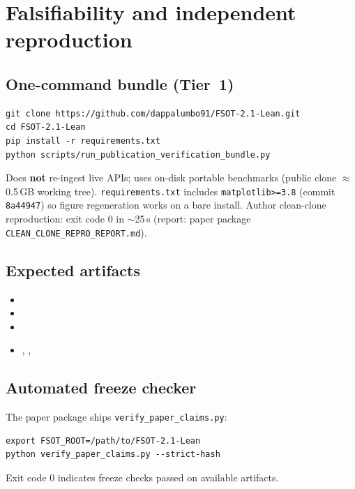 \documentclass[11pt,a4paper]{article}
\begin{document}
\section{Falsifiability and independent reproduction}
\label{sec:repro}

\subsection{One-command bundle (Tier~1)}

\begin{verbatim}
git clone https://github.com/dappalumbo91/FSOT-2.1-Lean.git
cd FSOT-2.1-Lean
pip install -r requirements.txt
python scripts/run_publication_verification_bundle.py
\end{verbatim}

Does \textbf{not} re-ingest live APIs; uses on-disk portable benchmarks
(public clone $\approx$0.5\,GB working tree).
\texttt{requirements.txt} includes \texttt{matplotlib>=3.8} (commit
\texttt{8a44947}) so figure regeneration works on a bare install.
Author clean-clone reproduction: exit code 0 in $\sim$25\,s
(report: paper package \texttt{CLEAN\_CLONE\_REPRO\_REPORT.md}).

\subsection{Expected artifacts}

\begin{itemize}[leftmargin=*,itemsep=0pt]
\item {}
\item {}
\item {}
\item {},
      , 
\end{itemize}

\subsection{Automated freeze checker}

The paper package ships \texttt{verify\_paper\_claims.py}:
\begin{verbatim}
export FSOT_ROOT=/path/to/FSOT-2.1-Lean
python verify_paper_claims.py --strict-hash
\end{verbatim}
Exit code 0 indicates freeze checks passed on available artifacts.
\end{document}
